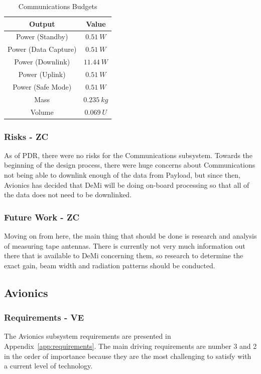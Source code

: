 \documentclass[12pt]{article}
\begin{document}
\begin{table}[ht]
\caption{Communications Budgets}
\label{table:comm_summary_outputs}
\begin{center}
    \begin{tabular}{|c||c|} \hline
    	Output & Value \\ \hline \hline
    Power (Standby) & $0.51\ W$  \\
    Power (Data Capture) & $0.51\ W$ \\
    Power (Downlink) & $11.44\ W$ \\
    Power (Uplink) & $0.51\ W$ \\
    Power (Safe Mode) & $0.51\ W$ \\
    Mass & $0.235\ kg$  \\
    Volume & $0.069\ U$ \\ \hline 
    \end{tabular}
\end{center}
\end{table}

			\subsubsection{Risks - ZC}

As of PDR, there were no risks for the Communications subsystem. Towards the beginning of the design process, there were huge concerns about Communications not being able to downlink enough of the data from Payload, but since then, Avionics has decided that DeMi will be doing on-board processing so that all of the data does not need to be downlinked.

			\subsubsection{Future Work - ZC}

Moving on from here, the main thing that should be done is research and analysis of measuring tape antennas. There is currently not very much information out there that is available to DeMi concerning them, so research to determine the exact gain, beam width and radiation patterns should be conducted.		
		

		\subsection{Avionics}
			\subsubsection{Requirements - VE}
The Avionics subsystem requirements are presented in Appendix~\ref{app:requirements}.  The main driving requirements are number 3 and 2 in the order of importance because they are the most challenging to satisfy with a current level of technology.
\end{document}

